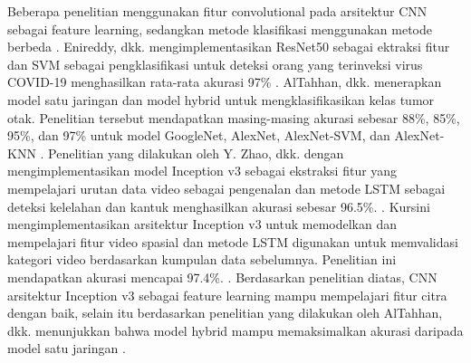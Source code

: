     Beberapa penelitian menggunakan fitur convolutional pada arsitektur CNN sebagai feature learning, sedangkan metode klasifikasi menggunakan metode berbeda \autocite{Novitasari2022}. Enireddy, dkk. mengimplementasikan ResNet50 sebagai ektraksi fitur dan SVM sebagai pengklasifikasi untuk deteksi orang yang terinveksi virus COVID-19 menghasilkan rata-rata akurasi 97\% \autocite{Enireddy2020}. AlTahhan, dkk. menerapkan model satu jaringan dan model hybrid untuk mengklasifikasikan kelas tumor otak. Penelitian tersebut mendapatkan masing-masing akurasi sebesar 88\%, 85\%, 95\%, dan 97\% untuk model GoogleNet, AlexNet, AlexNet-SVM, dan AlexNet-KNN \autocite{AlTahhan2023}. Penelitian yang dilakukan oleh Y. Zhao, dkk. dengan mengimplementasikan model Inception v3 sebagai ekstraksi fitur yang mempelajari urutan data video sebagai pengenalan dan metode LSTM sebagai deteksi kelelahan dan kantuk menghasilkan akurasi sebesar 96.5\%.  \autocite{Zhao2020}. Kursini mengimplementasikan arsitektur Inception v3 untuk memodelkan dan mempelajari fitur video spasial dan metode LSTM digunakan untuk memvalidasi kategori video berdasarkan kumpulan data sebelumnya. Penelitian ini mendapatkan akurasi mencapai 97.4\%. \autocite{Kusrini2022}. Berdasarkan penelitian diatas, CNN arsitektur Inception v3 sebagai feature learning mampu mempelajari fitur citra dengan baik, selain itu berdasarkan penelitian yang dilakukan oleh AlTahhan, dkk. menunjukkan bahwa model hybrid mampu memaksimalkan akurasi daripada model satu jaringan \autocite{AlTahhan2023}.


